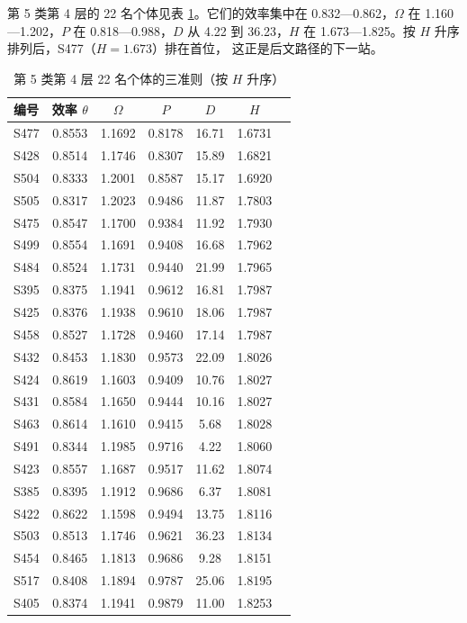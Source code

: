 第 5 类第 4 层的 22 名个体见表 \ref{tab:l4}。它们的效率集中在
0.832—0.862，$\Omega$ 在 1.160—1.202，$P$ 在 0.818—0.988，$D$ 从 4.22 到
36.23，$H$ 在 1.673—1.825。按 $H$ 升序排列后，S477（$H=1.673$）排在首位，
这正是后文路径的下一站。

\begin{table}[H]
\centering
\tabfont
\caption{第 5 类第 4 层 22 名个体的三准则（按 $H$ 升序）}
\label{tab:l4}
\begin{tabular}{@{}lcccccc@{}}
\toprule
编号 & 效率 $\theta$ & $\Omega$ & $P$ & $D$ & $H$ \\
\midrule
S477 & 0.8553 & 1.1692 & 0.8178 & 16.71 & 1.6731 \\
S428 & 0.8514 & 1.1746 & 0.8307 & 15.89 & 1.6821 \\
S504 & 0.8333 & 1.2001 & 0.8587 & 15.17 & 1.6920 \\
S505 & 0.8317 & 1.2023 & 0.9486 & 11.87 & 1.7803 \\
S475 & 0.8547 & 1.1700 & 0.9384 & 11.92 & 1.7930 \\
S499 & 0.8554 & 1.1691 & 0.9408 & 16.68 & 1.7962 \\
S484 & 0.8524 & 1.1731 & 0.9440 & 21.99 & 1.7965 \\
S395 & 0.8375 & 1.1941 & 0.9612 & 16.81 & 1.7987 \\
S425 & 0.8376 & 1.1938 & 0.9610 & 18.06 & 1.7987 \\
S458 & 0.8527 & 1.1728 & 0.9460 & 17.14 & 1.7987 \\
S432 & 0.8453 & 1.1830 & 0.9573 & 22.09 & 1.8026 \\
S424 & 0.8619 & 1.1603 & 0.9409 & 10.76 & 1.8027 \\
S431 & 0.8584 & 1.1650 & 0.9444 & 10.16 & 1.8027 \\
S463 & 0.8614 & 1.1610 & 0.9415 & 5.68 & 1.8028 \\
S491 & 0.8344 & 1.1985 & 0.9716 & 4.22 & 1.8060 \\
S423 & 0.8557 & 1.1687 & 0.9517 & 11.62 & 1.8074 \\
S385 & 0.8395 & 1.1912 & 0.9686 & 6.37 & 1.8081 \\
S422 & 0.8622 & 1.1598 & 0.9494 & 13.75 & 1.8116 \\
S503 & 0.8513 & 1.1746 & 0.9621 & 36.23 & 1.8134 \\
S454 & 0.8465 & 1.1813 & 0.9686 & 9.28 & 1.8151 \\
S517 & 0.8408 & 1.1894 & 0.9787 & 25.06 & 1.8195 \\
S405 & 0.8374 & 1.1941 & 0.9879 & 11.00 & 1.8253 \\
\bottomrule
\end{tabular}
\end{table}


